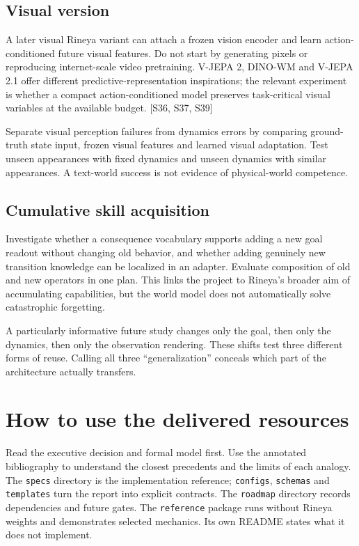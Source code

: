 \documentclass[
  11pt,
  a4paper,
]{article}
\begin{document}
\subsection{Visual version}\label{visual-version}

A later visual Rineya variant can attach a frozen vision encoder and
learn action-conditioned future visual features. Do not start by
generating pixels or reproducing internet-scale video pretraining.
V-JEPA 2, DINO-WM and V-JEPA 2.1 offer different
predictive-representation inspirations; the relevant experiment is
whether a compact action-conditioned model preserves task-critical
visual variables at the available budget. {[}S36, S37, S39{]}

Separate visual perception failures from dynamics errors by comparing
ground-truth state input, frozen visual features and learned visual
adaptation. Test unseen appearances with fixed dynamics and unseen
dynamics with similar appearances. A text-world success is not evidence
of physical-world competence.

\subsection{Cumulative skill
acquisition}\label{cumulative-skill-acquisition}

Investigate whether a consequence vocabulary supports adding a new goal
readout without changing old behavior, and whether adding genuinely new
transition knowledge can be localized in an adapter. Evaluate
composition of old and new operators in one plan. This links the project
to Rineya's broader aim of accumulating capabilities, but the world
model does not automatically solve catastrophic forgetting.

A particularly informative future study changes only the goal, then only
the dynamics, then only the observation rendering. These shifts test
three different forms of reuse. Calling all three ``generalization''
conceals which part of the architecture actually transfers.

\section{How to use the delivered
resources}\label{how-to-use-the-delivered-resources}

Read the executive decision and formal model first. Use the annotated
bibliography to understand the closest precedents and the limits of each
analogy. The \texttt{specs} directory is the implementation reference;
\texttt{configs}, \texttt{schemas} and \texttt{templates} turn the
report into explicit contracts. The \texttt{roadmap} directory records
dependencies and future gates. The \texttt{reference} package runs
without Rineya weights and demonstrates selected mechanics. Its own
README states what it does not implement.
\end{document}
